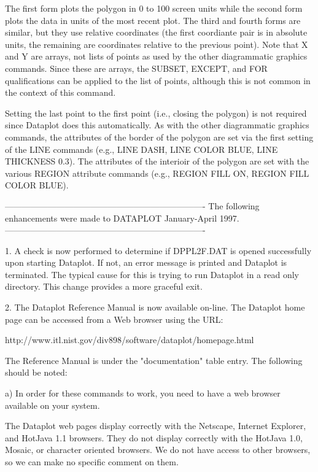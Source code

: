 {    The first form plots the polygon in 0 to 100 screen units while
    the second form plots the data in units of the most recent plot.
    The third and fourth forms are similar, but they use relative 
    coordinates (the first coordiante pair is in absolute units,
    the remaining are coordinates relative to the previous point).
    Note that X and Y are arrays, not lists of points as used by
    the other diagrammatic graphics commands.  Since these are
    arrays, the SUBSET, EXCEPT, and FOR qualifications can be
    applied to the list of points, although this is not common
    in the context of this command.  

    Setting the last point to the first point (i.e., closing the
    polygon) is not required since Dataplot does this automatically.
    As with the other diagrammatic graphics commands, the attributes
    of the border of the polygon are set via the first setting
    of the LINE commands (e.g., LINE DASH, LINE COLOR BLUE, LINE
    THICKNESS 0.3).  The attributes of the interioir of the polygon
    are set with the various REGION attribute commands (e.g.,
    REGION FILL ON, REGION FILL COLOR BLUE). 

----------------------------------------------------------------------
The following enhancements were made to DATAPLOT January-April   1997.
----------------------------------------------------------------------

 1. A check is now performed to determine if DPPL2F.DAT is opened
    successfully upon starting Dataplot.  If not, an error message is
    printed and Dataplot is terminated.  The typical cause for this
    is trying to run Dataplot in a read only directory.  This change
    provides a more graceful exit.

 2. The Dataplot Reference Manual is now available on-line.  The
    Dataplot home page can be accessed from a Web browser using
    the URL:

       http://www.itl.nist.gov/div898/software/dataplot/homepage.html

    The Reference Manual is under the "documentation" table entry.
    The following should be noted:

    a) In order for these commands to work, you need to have
       a web browser available on your system.

       The Dataplot web pages display correctly with the Netscape,
       Internet Explorer, and HotJava 1.1  browsers.  They do not
       display correctly with the HotJava 1.0, Mosaic, or character
       oriented browsers.  We do not have access to other browsers,
       so we can make no specific comment on them.

}
